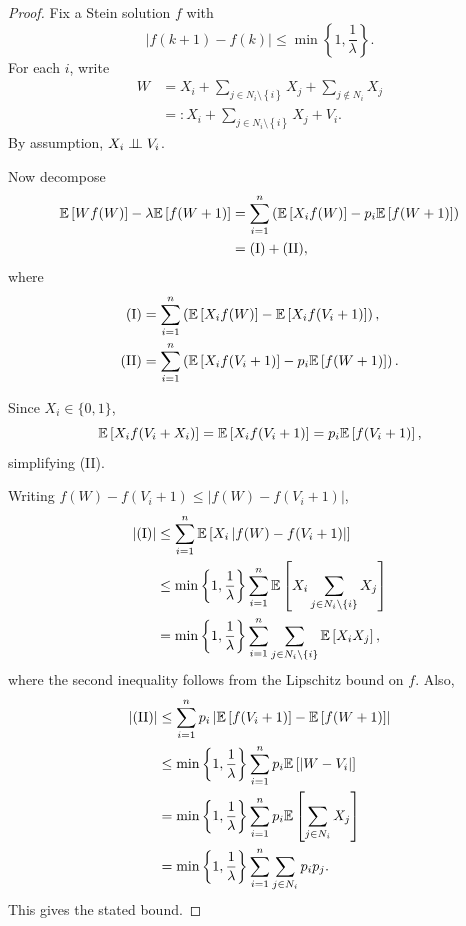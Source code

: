 \begin{proof} 
	Fix a Stein solution $f$ with
	\[
		\left| f(k+1) - f(k) \right| \le \min\left\{1,\frac{1}{\lambda}\right\}.
	\]
	For each $i$, write
	\begin{align*}
		W
		&= X_i + \sum\limits_{j\in N_i \setminus \left\{i\right\}}^{} X_j + \sum\limits_{j \not\in N_i}^{} X_j \\
		&=: X_i + \sum\limits_{j \in N_i \setminus \left\{i\right\}}^{} X_j + V_i.
	\end{align*} 
	By assumption, $X_i \perp\!\!\!\perp V_i$.

	Now decompose
	\begin{align*}
		\mathbb{E}\left[W f(W)\right] - \lambda\mathbb{E}\left[f(W+1)\right] 
		&= \sum\limits_{i=1}^{n} \left( \mathbb{E}\left[X_i f(W)\right] - p_i \mathbb{E}\left[f(W+1)\right]  \right)\\
		&= \text{(I)} + \text{(II)},
	\end{align*}
	where
	\begin{align*}
		\text{(I)}
		&= \sum\limits_{i=1}^{n} \left( \mathbb{E}\left[X_i f(W)\right] - \mathbb{E}\left[X_i f(V_i + 1)\right]  \right), \\
		\text{(II)}
		&= \sum\limits_{i=1}^{n} \left( \mathbb{E}\left[X_i f(V_i + 1)\right] - p_i \mathbb{E}\left[f(W+1)\right] \right).
	\end{align*}

	Since $X_i \in \{0,1\}$,
	\[
		\mathbb{E}\left[X_i f(V_i + X_i)\right]
		= \mathbb{E}\left[X_i f(V_i+1)\right]
		= p_i \mathbb{E}\left[f(V_i + 1)\right]
	,\] simplifying (II).

	Writing $f(W) - f(V_i +1) \le \left| f(W) - f(V_i+ 1) \right|$,
	\begin{align*}
		\left| \text{(I)} \right|
		&\le \sum\limits_{i=1}^{n} \mathbb{E}\left[X_i \left| f(W) - f(V_i + 1) \right|\right] \\
		&\le \min\left\{1,\frac{1}{\lambda}\right\}
			\sum\limits_{i=1}^{n}
			\mathbb{E}\left[X_i \sum\limits_{j \in N_i \setminus \left\{i\right\}}^{} X_j\right] \\
		&= \min \left\{1,\frac{1}{\lambda}\right\}
			\sum\limits_{i=1}^{n} \sum\limits_{j \in N_i \setminus \left\{i\right\}}^{} \mathbb{E}\left[X_i X_j\right]
	,\end{align*}
	where the second inequality follows from the Lipschitz bound on $f$.
	Also,
	\begin{align*}
		\left| \text{(II)} \right|
		&\le \sum\limits_{i=1}^{n} p_i \left| \mathbb{E}\left[f(V_i+1)\right] - \mathbb{E}\left[f(W+1)\right] \right| \\
		&\le \min \left\{1,\frac{1}{\lambda}\right\}
			\sum\limits_{i=1}^{n} p_i \mathbb{E}\left[\left| W - V_i \right|\right] \\
		&= \min \left\{1,\frac{1}{\lambda}\right\}
			\sum\limits_{i=1}^{n} p_i \mathbb{E}\left[\sum\limits_{j \in N_i}^{} X_j\right] \\
		&= \min \left\{1,\frac{1}{\lambda}\right\}
			\sum\limits_{i=1}^{n} \sum\limits_{j \in N_i}^{} p_i p_j.
	\end{align*}
	This gives the stated bound.
\end{proof}

